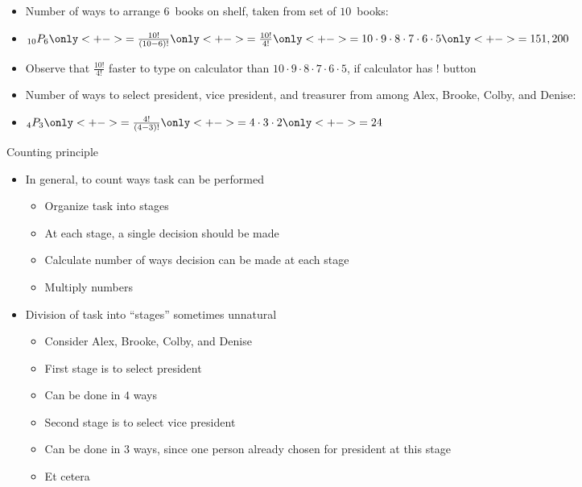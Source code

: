 \documentclass[handout]{beamer}
\theoremstyle{definition}
\begin{document}
\begin{frame}
\begin{example}
\begin{itemize}
\item Number of ways to arrange $6$~books
on shelf, taken from set of $10$~books:
\item $_{10}P_6
\only<+->{=\frac{10!}{\left(10-6\right)!}}
\only<+->{=\frac{10!}{4!}}
\only<+->{=10\cdot 9\cdot 8\cdot 7\cdot 6\cdot 5}
\only<+->{=151,200}$
\item Observe that $\frac{10!}{4!}$ faster to type
on calculator than 
$10\cdot 9\cdot 8\cdot 7\cdot 6\cdot 5$, if calculator
has $!$ button
\end{itemize}
\end{example}
\begin{example}
\begin{itemize}
\item Number of ways to select president, vice president,
and treasurer from among Alex, Brooke, Colby, and Denise:
\item $_4P_3
\only<+->{=\frac{4!}{\left(4-3\right)!}}
\only<+->{=4\cdot 3\cdot 2}
\only<+->{=24}$
\end{itemize}
\end{example}
\end{frame}

\begin{frame}{Counting principle}
\begin{itemize}
\item In general, to count ways task can be performed
\begin{itemize}
\item Organize task into stages
\item At each stage, a single decision should be made
\item Calculate number of ways decision can
be made at each stage
\item Multiply numbers
\end{itemize}
\item Division of task into ``stages'' sometimes unnatural
\begin{example}
\begin{itemize}
\item Consider Alex, Brooke, Colby, and Denise
\item First stage is to select president
\item Can be done in $4$ ways
\item Second stage is to select vice president
\item Can be done in $3$ ways, since one person already
chosen for president at this stage
\item Et cetera
\end{itemize}
\end{example}
\end{itemize}
\end{frame}
\end{document}
